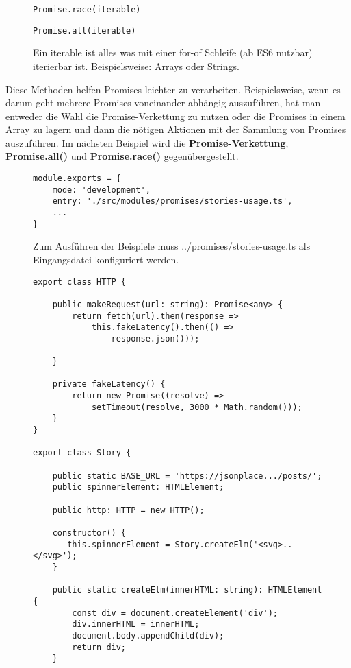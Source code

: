 \begin{description}

\begin{figure}[H]
\item \begin{lstlisting}[basicstyle=\small]
Promise.race(iterable)
\end{lstlisting}

\item \begin{lstlisting}[basicstyle=\small]
Promise.all(iterable)
\end{lstlisting}
\caption{Ein iterable ist alles was mit einer for-of Schleife (ab ES6 nutzbar) iterierbar ist. Beispielsweise: Arrays oder Strings.}
\end{figure}
\end{description}

\noindent
Diese Methoden helfen Promises leichter zu verarbeiten. Beispielsweise, wenn es darum geht mehrere Promises voneinander abhängig auszuführen, hat man entweder die Wahl die Promise-Verkettung zu nutzen oder die Promises in einem Array zu lagern und dann die nötigen Aktionen mit der Sammlung von Promises auszuführen. Im nächsten Beispiel wird die \textbf{Promise-Verkettung}, \textbf{Promise.all()} und \textbf{Promise.race()} gegenübergestellt.

\begin{figure}[H]
\begin{lstlisting}[basicstyle=\small]
module.exports = {
    mode: 'development',
    entry: './src/modules/promises/stories-usage.ts',
    ...
}
\end{lstlisting}
\caption{Zum Ausführen der Beispiele muss ../promises/stories-usage.ts als Eingangsdatei konfiguriert werden.}
\end{figure}

\begin{figure}[H]
\begin{lstlisting}[basicstyle=\small]
export class HTTP {

    public makeRequest(url: string): Promise<any> {
        return fetch(url).then(response =>
            this.fakeLatency().then(() =>
                response.json()));

    }

    private fakeLatency() {
        return new Promise((resolve) =>
            setTimeout(resolve, 3000 * Math.random()));
    }
}

export class Story {

    public static BASE_URL = 'https://jsonplace.../posts/';
    public spinnerElement: HTMLElement;

    public http: HTTP = new HTTP();

    constructor() {
       this.spinnerElement = Story.createElm('<svg>..</svg>');
    }

    public static createElm(innerHTML: string): HTMLElement {
        const div = document.createElement('div');
        div.innerHTML = innerHTML;
        document.body.appendChild(div);
        return div;
    }
\end{lstlisting}
\end{figure}

